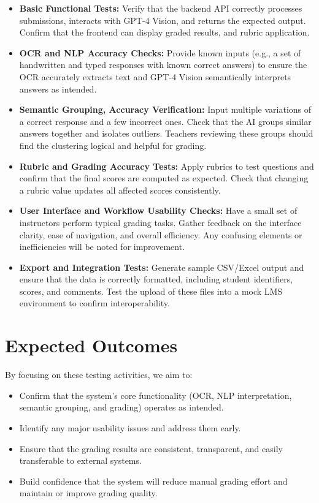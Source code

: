 \documentclass[ms,twoside,print]{nuthesis}
\begin{document}
\begin{itemize}
    \item \textbf{Basic Functional Tests:}  
    Verify that the backend API correctly processes submissions, interacts with GPT-4 Vision, and returns the expected output. Confirm that the frontend can display graded results, and rubric application.

    \item \textbf{OCR and NLP Accuracy Checks:}  
    Provide known inputs (e.g., a set of handwritten and typed responses with known correct answers) to ensure the OCR accurately extracts text and GPT-4 Vision semantically interprets answers as intended.

    \item \textbf{Semantic Grouping, Accuracy Verification:}  
    Input multiple variations of a correct response and a few incorrect ones. Check that the AI groups similar answers together and isolates outliers. Teachers reviewing these groups should find the clustering logical and helpful for grading.

    \item \textbf{Rubric and Grading Accuracy Tests:}  
    Apply rubrics to test questions and confirm that the final scores are computed as expected. Check that changing a rubric value updates all affected scores consistently.

    \item \textbf{User Interface and Workflow Usability Checks:}  
    Have a small set of instructors perform typical grading tasks. Gather feedback on the interface clarity, ease of navigation, and overall efficiency. Any confusing elements or inefficiencies will be noted for improvement.

    \item \textbf{Export and Integration Tests:}  
    Generate sample CSV/Excel output and ensure that the data is correctly formatted, including student identifiers, scores, and comments. Test the upload of these files into a mock LMS environment to confirm interoperability.
\end{itemize}

\section{Expected Outcomes}

By focusing on these testing activities, we aim to:

\begin{itemize}
    \item Confirm that the system’s core functionality (OCR, NLP interpretation, semantic grouping, and grading) operates as intended.
    \item Identify any major usability issues and address them early.
    \item Ensure that the grading results are consistent, transparent, and easily transferable to external systems.
    \item Build confidence that the system will reduce manual grading effort and maintain or improve grading quality.
\end{itemize}
\end{document}
